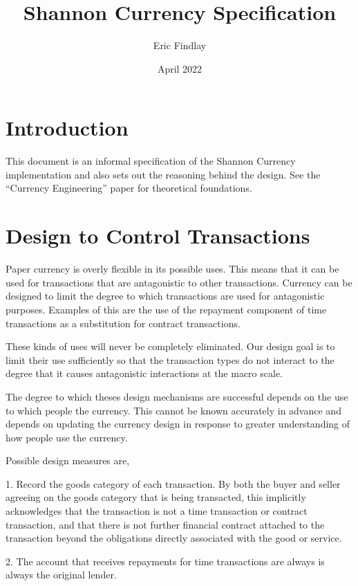 \documentclass[a4paper]{book}
\begin{document}
    \title{Shannon Currency Specification}
    \author{Eric Findlay}
    \date{April 2022}
    \maketitle

    \tableofcontents

\section{Introduction}

This document is an informal specification of the Shannon Currency implementation and also sets out
the reasoning behind the design. See the ``Currency Engineering'' paper for theoretical foundations.

\section{Design to Control Transactions}

Paper currency is overly flexible in its possible uses. This means that it can be used for
transactions that are antagonistic to other transactions. Currency can be designed to limit the
degree to which transactions are used for antagonistic purposes. Examples of this are the use of
the repayment component of time transactions as a substitution for contract transactions. 

These kinds of uses will never be completely eliminated. Our design goal is to limit their use
sufficiently so that the transaction types do not interact to the degree that it causes antagonistic
interactions at the macro scale.

The degree to which theses design mechanisms are successful depends on the use to which people the
currency. This cannot be known accurately in advance and depends on updating the currency design in
response to greater understanding of how people use the currency.  

Possible design measures are,

1. Record the goods category of each transaction. By both the buyer and seller agreeing on the
goods category that is being transacted, this implicitly acknowledges that the transaction is
not a time transaction or contract transaction, and that there is not further financial contract
attached to the transaction beyond the obligations directly associated with the good or service.

2. The account that receives repayments for time transactions are always is always the original
lender.
\end{document}
